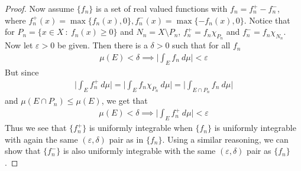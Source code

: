 \documentclass[12pt]{exam}
\theoremstyle{plain} %
\theoremstyle{definition} %
\theoremstyle{remark} %
\begin{document}
\begin{questions}
\begin{solution}
\begin{proof}
      Now assume $\{ f_n \}$ is a  set of real valued functions with
      $f_n = f_n^+ - f_n^-$, where
      $f_n^+(x) = \max \{ f_n(x), 0 \}, f_n^-( x) = \max \{ -f_n(x), 0
      \}$. Notice that for $P_n = \{ x \in X \ : \ f_n(x) \ge 0 \}$ and
      $N_n = X \setminus P_n$, $f_n^+ = f_n \chi_{P_n}$ and $f_n^- =
      f_n \chi_{N_n}$. Now let $\varepsilon > 0$ be given. Then there
      is a $\delta > 0$ such that for all $f_n$
      \begin{align*}
        \mu(E) < \delta \implies \Bigg| \int_E f_n \ d \mu \Bigg| <
        \varepsilon
      \end{align*}
      But since
      \begin{align*}
        \Bigg| \int_E f_n^+ \ d \mu \Bigg| = \Bigg| \int_E f_n
        \chi_{P_n} \ d \mu \Bigg| = \Bigg| \int_{E \cap P_n} f_n
        \ d \mu \Bigg|
      \end{align*}
      and $\mu(E \cap P_n) \le \mu(E)$, we get that
      \begin{align*}
        \mu(E) < \delta \implies \Bigg| \int_E f_n^+ \ d \mu \Bigg| <
        \varepsilon
      \end{align*}
      Thus we see that $\{ f_n^+ \}$ is uniformly integrable when $\{
      f_n \}$ is uniformly integrable with again the same
      $(\varepsilon, \delta)$ pair as in $\{ f_n \}$. Using a similar
      reasoning, we can show that $\{ f_n^- \}$ is also uniformly
      integrable with the same $(\varepsilon, \delta)$ pair as $\{ f_n \}$.


\end{proof}
\end{solution}
\end{questions}
\end{document}
